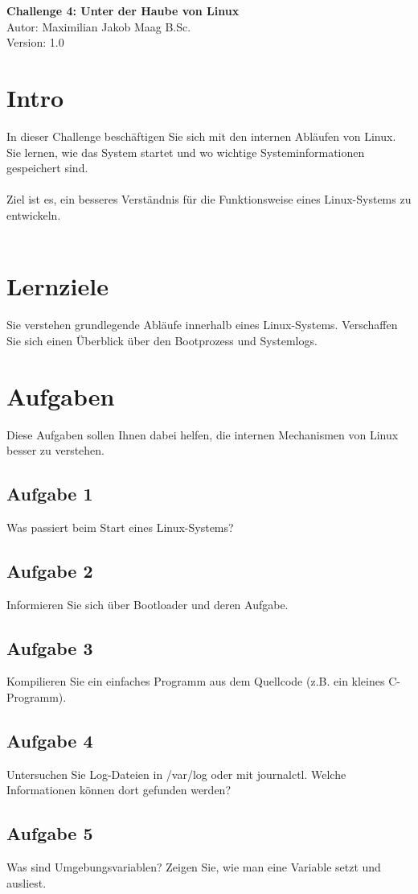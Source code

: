 \documentclass{article}
\begin{document}
    \begin{center}
        \Large \textbf{Challenge 4: Unter der Haube von Linux} \\ [6pt]
        \normalsize
        Autor: Maximilian Jakob Maag B.Sc. \\
        Version: 1.0
    \end{center}

    \section{Intro}
    In dieser Challenge beschäftigen Sie sich mit den internen Abläufen von Linux.
    Sie lernen, wie das System startet und wo wichtige Systeminformationen gespeichert sind. \\\\
    Ziel ist es, ein besseres Verständnis für die Funktionsweise eines Linux-Systems zu entwickeln. \\\\

    \section{Lernziele}
    Sie verstehen grundlegende Abläufe innerhalb eines Linux-Systems.
    Verschaffen Sie sich einen Überblick über den Bootprozess und Systemlogs.

    \section{Aufgaben}
    Diese Aufgaben sollen Ihnen dabei helfen, die internen Mechanismen von Linux besser zu verstehen.

    \subsection{Aufgabe 1}
    Was passiert beim Start eines Linux-Systems?

    \subsection{Aufgabe 2}
    Informieren Sie sich über Bootloader und deren Aufgabe.

    \subsection{Aufgabe 3}
    Kompilieren Sie ein einfaches Programm aus dem Quellcode (z.B. ein kleines C-Programm).

    \subsection{Aufgabe 4}
    Untersuchen Sie Log-Dateien in /var/log oder mit journalctl.
    Welche Informationen können dort gefunden werden?

    \subsection{Aufgabe 5}
    Was sind Umgebungsvariablen?
    Zeigen Sie, wie man eine Variable setzt und ausliest.
\end{document}
